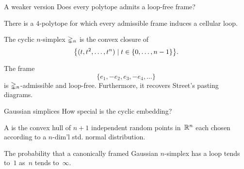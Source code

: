 \begin{frame}{A weaker version}
	\pause
	 Does every polytope admits a loop-free frame?
	
	\pause\bigskip
	 There is a $4$-polytope for which every admissible frame induces a cellular loop.
\end{frame}

\begin{frame}{The cyclic $n$-simplex}
	\pause
	$\gsimplex_n$ is the convex closure of
	\[
	\set[\big]{(t,t^2,\dots,t^n) \mid t \in \{0,\dots,n-1\}}.
	\]
	
	\begin{minipage}{.35\textwidth}
		\par
		\begin{center}
		\end{center}
	\end{minipage}
	\begin{minipage}{.6\textwidth}
		\pause
		The frame
		\[
		\{e_1,-e_2,e_3,-e_4,\dots\}
		\]
		is $\gsimplex_n$-admissible and loop-free.
		Furthermore, it recovers Street's pasting diagrams.
	\end{minipage}
\end{frame}

\begin{frame}{Gaussian simplices}
	\pause
	How special is the cyclic embedding?
	
	\pause\bigskip
	A  is the convex hull of $n+1$ independent random points in~$\R^n$ each chosen according to a $n$-dim'l std. normal distribution.
	
	\pause\bigskip
	 The probability that a canonically framed Gaussian $n$-simplex has a loop tends to~$1$ as~$n$ tends to~$\infty$.
\end{frame}